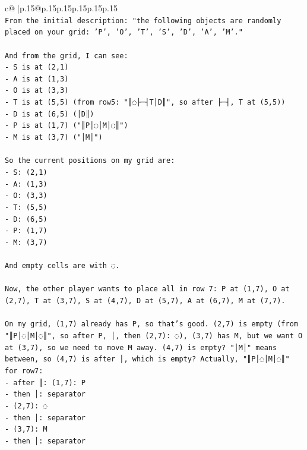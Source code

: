 \documentclass{article}
\begin{document}
{\begin{supertabular}{c@{$\;$}|p{.15\linewidth}@{}p{.15\linewidth}p{.15\linewidth}p{.15\linewidth}p{.15\linewidth}p{.15\linewidth}}
{{{\\ 
\texttt{From the initial description: "the following objects are randomly placed on your grid: 'P', 'O', 'T', 'S', 'D', 'A', 'M'."} \\
\\ 
\texttt{And from the grid, I can see:} \\
\texttt{{-} S is at (2,1)} \\
\texttt{{-} A is at (1,3)} \\
\texttt{{-} O is at (3,3)} \\
\texttt{{-} T is at (5,5) (from row5: "║◌├─┤T│D║", so after ├─┤, T at (5,5))} \\
\texttt{{-} D is at (6,5) (│D║)} \\
\texttt{{-} P is at (1,7) ("║P│◌│M│◌║")} \\
\texttt{{-} M is at (3,7) ("│M│")} \\
\\ 
\texttt{So the current positions on my grid are:} \\
\texttt{{-} S: (2,1)} \\
\texttt{{-} A: (1,3)} \\
\texttt{{-} O: (3,3)} \\
\texttt{{-} T: (5,5)} \\
\texttt{{-} D: (6,5)} \\
\texttt{{-} P: (1,7)} \\
\texttt{{-} M: (3,7)} \\
\\ 
\texttt{And empty cells are with ◌.} \\
\\ 
\texttt{Now, the other player wants to place all in row 7: P at (1,7), O at (2,7), T at (3,7), S at (4,7), D at (5,7), A at (6,7), M at (7,7).} \\
\\ 
\texttt{On my grid, (1,7) already has P, so that's good. (2,7) is empty (from "║P│◌│M│◌║", so after P, │, then (2,7): ◌), (3,7) has M, but we want O at (3,7), so we need to move M away. (4,7) is empty? "│M│" means between, so (4,7) is after │, which is empty? Actually, "║P│◌│M│◌║" for row7: } \\
\texttt{{-} after ║: (1,7): P} \\
\texttt{{-} then │: separator} \\
\texttt{{-} (2,7): ◌} \\
\texttt{{-} then │: separator} \\
\texttt{{-} (3,7): M} \\
\texttt{{-} then │: separator} \\
}}}
\end{supertabular}}
\end{document}

